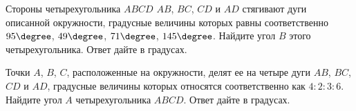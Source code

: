 \begin{class}[number=5]
\begin{listofex}
		\item Стороны четырехугольника \( ABCD \) \( AB \), \( BC \), \( CD \) и \( AD \) стягивают дуги описанной окружности, градусные величины которых равны соответственно \( 95\degree \), \( 49\degree \), \( 71\degree \), \( 145\degree \). Найдите угол \( B \) этого четырехугольника. Ответ дайте в градусах.
		\item Точки \( A \), \( B \), \( C \), расположенные на окружности, делят ее на четыре дуги \( AB \), \( BC \), \( CD \) и \( AD \), градусные величины которых относятся соответственно как \( 4:2:3:6 \). Найдите угол \( A \) четырехугольника \( ABCD \). Ответ дайте в градусах.
	\end{listofex}
\end{class}

